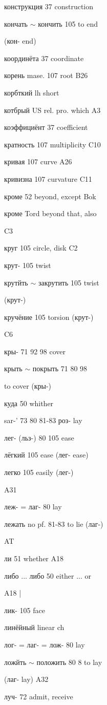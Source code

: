 \begin{minipage}[t]{0.475\textwidth}
\raggedright
\noindent конструкция 37 construction\par
\noindent кончать $\sim$ кончить 105 to end\par
\noindent (кон- end)\par
\noindent координёта 37 coordinate\par
\noindent корень mase. 107 root B26\par
\noindent корбткий lh short\par
\noindent котбрый US rel. pro. which A3\par
\noindent коэффициёнт 37 coefficient\par
\noindent кратность 107 multiplicity C10\par
\noindent кривая 107 curve A26\par
\noindent кривизна 107 curvature C11\par
\noindent кроме 52 beyond, except Bok\par
\noindent кроме Tord beyond that, also\par
\noindent C3\par
\noindent круг 105 circle, disk C2\par
\noindent крут- 105 twist\par
\noindent крутйть $\sim$ закрутить 105 twist\par
\noindent (крут-)\par
\noindent кручёние 105 torsion (крут-)\par
\noindent C6\par
\noindent кры- 71 92 98 cover\par
\noindent крыть $\sim$ покрыть 71 80 98 \par
\noindent to cover (кры-)\par
\noindent куда 50 whither\par
\noindent sar-' 73 80 81-83 роз- lay\par
\noindent лег- (льз-) 80 105 ease\par
\noindent лёгкий 105 ease (лег- ease)\par
\noindent легко 105 easily (лег-)\par
\noindent A31\par
\noindent леж- = лаг- 80 lay\par
\noindent лежать no pf. 81-83 to lie (лаг-)\par
\noindent AT\par
\noindent ли 51 whether A18\par
{} либо ... либо 50 either ... or\par
\noindent A18 |\par
\noindent лик- 105 face\par
\noindent линёйный linear ch\par
\noindent лог- = лаг- = лож- 80 lay\par
\noindent *ложйть $\sim$ положить 80 8 to lay\par
\noindent (лаг- lay) A32\par
\noindent луч- 72 admit, receive\par
\end{minipage}
\endgroup

